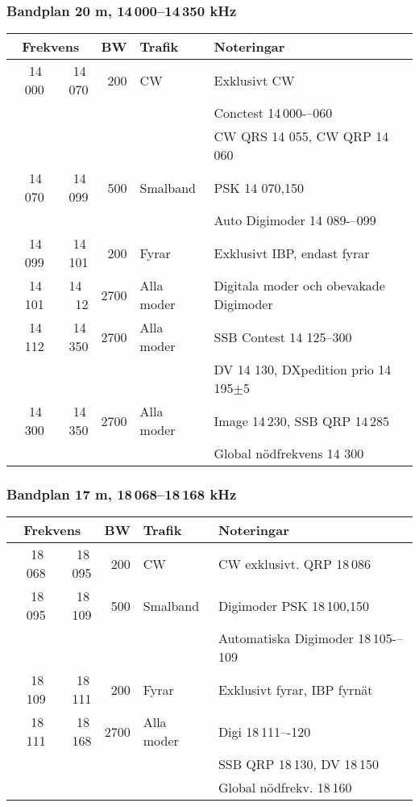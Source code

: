 \subsubsection{Bandplan 20 m, 14\,000--14\,350 kHz}
\begin{tabular}{rrrll}
\multicolumn{2}{c}{\textbf{Frekvens}} & \textbf{BW} & \textbf{Trafik} & \textbf{Noteringar} \\ \hline
14\,000 & 14\,070 & 200  & CW         & Exklusivt CW                             \\
        &         &      &            & Conctest 14\,000-–060                    \\
        &         &      &            & CW QRS 14 055, CW QRP 14\,060            \\ \hline
14\,070 & 14\,099 & 500  & Smalband   & PSK 14 070,150                           \\
        &         &      &            & Auto Digimoder 14 089-–099               \\ \hline
14\,099 & 14\,101 & 200  & Fyrar      & Exklusivt IBP, endast fyrar              \\ \hline
14\,101 & 14 \,12 & 2700 & Alla moder & Digitala moder och obevakade Digimoder   \\ \hline
14\,112 & 14\,350 & 2700 & Alla moder & SSB Contest 14 125--300                  \\
        &         &      &            & DV 14 130, DXpedition prio 14\,195$\pm$5 \\ \hline
14\,300 & 14\,350 & 2700 & Alla moder & Image 14\,230, SSB QRP 14\,285           \\
        &         &      &            & Global nödfrekvens 14 300                \\ \hline
\end{tabular}

\subsubsection{Bandplan 17 m, 18\,068--18\,168 kHz}
\begin{tabular}{rrrll}
\multicolumn{2}{c}{\textbf{Frekvens}} & \textbf{BW} & \textbf{Trafik} & \textbf{Noteringar} \\ \hline

18\,068 & 18\,095 & 200  & CW         & CW exklusivt. QRP 18\,086             \\ \hline
18\,095 & 18\,109 & 500  & Smalband   & Digimoder PSK 18\,100,150             \\
        &         &      &            & Automatiska Digimoder 18\,105-–109 \\ \hline
18\,109 & 18\,111 & 200  & Fyrar      & Exklusivt fyrar, IBP fyrnät           \\ \hline
18\,111 & 18\,168 & 2700 & Alla moder & Digi 18\,111–-120                   \\
        &         &      &            & SSB QRP 18\,130, DV 18\,150           \\
        &         &      &            & Global nödfrekv. 18\,160              \\ \hline
\end{tabular}

